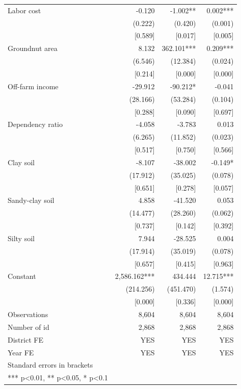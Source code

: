 \documentclass[
]{article}
\begin{document}
\begin{landscape}
\begin{ThreePartTable}
\begin{longtable}[t]{lrrr}
Labor cost & -0.120 & -1.002** & 0.002***\\
 & (0.222) & (0.420) & (0.001)\\
 & {}[0.589] & {}[0.017] & {}[0.005]\\
Groundnut area & 8.132 & 362.101*** & 0.209***\\
 & (6.546) & (12.384) & (0.024)\\
 & {}[0.214] & {}[0.000] & {}[0.000]\\
Off-farm income & -29.912 & -90.212* & -0.041\\
 & (28.166) & (53.284) & (0.104)\\
 & {}[0.288] & {}[0.090] & {}[0.697]\\
Dependency ratio & -4.058 & -3.783 & 0.013\\
 & (6.265) & (11.852) & (0.023)\\
 & {}[0.517] & {}[0.750] & {}[0.566]\\
Clay soil & -8.107 & -38.002 & -0.149*\\
 & (17.912) & (35.025) & (0.078)\\
 & {}[0.651] & {}[0.278] & {}[0.057]\\
Sandy-clay soil & 4.858 & -41.520 & 0.053\\
 & (14.477) & (28.260) & (0.062)\\
 & {}[0.737] & {}[0.142] & {}[0.392]\\
Silty soil & 7.944 & -28.525 & 0.004\\
 & (17.914) & (35.019) & (0.078)\\
 & {}[0.657] & {}[0.415] & {}[0.963]\\
Constant & 2,586.162*** & 434.444 & 12.715***\\
 & (214.256) & (451.470) & (1.574)\\
 & {}[0.000] & {}[0.336] & {}[0.000]\\
Observations & 8,604 & 8,604 & 8,604\\
Number of id & 2,868 & 2,868 & 2,868\\
District FE & YES & YES & YES\\
Year FE & YES & YES & YES\\
Standard errors in brackets &  &  & \\
*** p<0.01, ** p<0.05, * p<0.1 &  &  & \\*
\end{longtable}
\end{ThreePartTable}
\endgroup{}
\end{landscape}
\newpage
\end{document}

